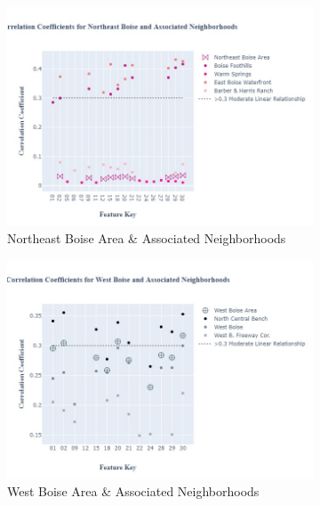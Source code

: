 \documentclass{article}
\begin{document}
\begin{figure}[H]
\begin{subfigure}[b]{0.45\textwidth}
         \includegraphics[width=\textwidth]{NE_fig.jpg}
         \caption{Northeast Boise Area \& Associated Neighborhoods}
         \label{fig: ne_ccg}
     \end{subfigure}
               \begin{subfigure}[b]{0.45\textwidth}
         \centering
         \includegraphics[width=\textwidth]{WB_fig.jpg}
         \caption{West Boise Area \& Associated Neighborhoods}
         \label{fig: wb_ccg}
     \end{subfigure}
               \begin{subfigure}[b]{0.45\textwidth}
         \centering

\end{subfigure}
\end{figure}
\end{document}
